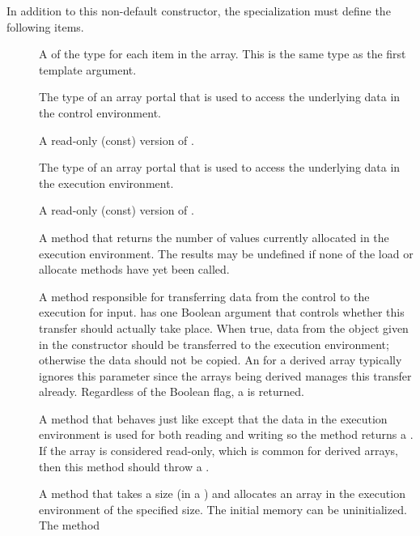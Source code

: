 In addition to this non-default constructor, the
 specialization must define the following
items.
\begin{description}
\item[] A  of the type for each item
  in the array. This is the same type as the first template argument.
\item[] The type of an array portal that is used to
  access the underlying data in the control environment.
\item[] A read-only (const) version of
  .
\item[] The type of an array portal that is used
  to access the underlying data in the execution environment.
\item[] A read-only (const) version of
  .
\item[] A method that returns the number of
  values currently allocated in the execution environment. The results may
  be undefined if none of the load or allocate methods have yet been
  called.
\item[] A method responsible for transferring
  data from the control to the execution for input.
   has one Boolean argument that controls whether
  this transfer should actually take place. When true, data from the
   object given in the constructor should be
  transferred to the execution environment; otherwise the data should not
  be copied. An  for a derived array
  typically ignores this parameter since the arrays being derived manages
  this transfer already. Regardless of the Boolean flag, a
   is returned.
\item[] A method that behaves just like
   except that the data in the execution
  environment is used for both reading and writing so the method returns a
  . If the array is considered read-only,
  which is common for derived arrays, then this method should throw a
  .
\item[] A method that takes a size (in a
  ) and allocates an array in the execution environment of the
  specified size. The initial memory can be uninitialized. The method

\end{description}
